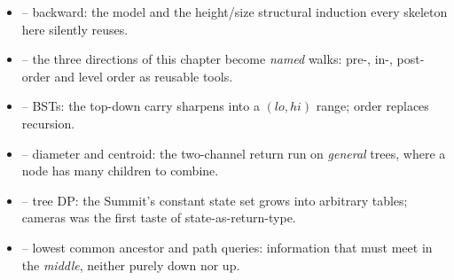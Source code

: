 
\begin{itemize}[nosep, leftmargin=1.4em]
  \item {} -- backward: the  model and the height/size
        structural induction every skeleton here silently reuses.
  \item {} -- the three directions of this chapter become \emph{named} walks:
        pre-, in-, post-order and level order as reusable tools.
  \item {} -- BSTs: the top-down carry sharpens into a $(\mathit{lo},\mathit{hi})$
        range; order replaces recursion.
  \item {} -- diameter and centroid: the two-channel return run on
        \emph{general} trees, where a node has many children to combine.
  \item {} -- tree DP: the Summit's constant state set grows into arbitrary
        tables; cameras was the first taste of state-as-return-type.
  \item {} -- lowest common ancestor and path queries: information that must
        meet in the \emph{middle}, neither purely down nor up.
\end{itemize}

